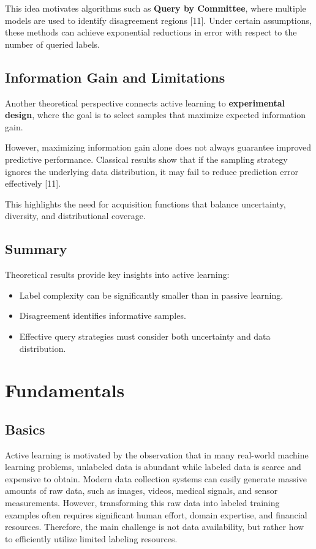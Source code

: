 \documentclass{article}
\renewcommand{\cite}[1]{[#1]}
\begin{document}
This idea motivates algorithms such as \textbf{Query by Committee}, where multiple models are used to identify disagreement regions \cite{11}. Under certain assumptions, these methods can achieve exponential reductions in error with respect to the number of queried labels.

\subsection{Information Gain and Limitations}

Another theoretical perspective connects active learning to \textbf{experimental design}, where the goal is to select samples that maximize expected information gain.

However, maximizing information gain alone does not always guarantee improved predictive performance. Classical results show that if the sampling strategy ignores the underlying data distribution, it may fail to reduce prediction error effectively \cite{11}.

This highlights the need for acquisition functions that balance uncertainty, diversity, and distributional coverage.

\subsection{Summary}

Theoretical results provide key insights into active learning:
\begin{itemize}
    \item Label complexity can be significantly smaller than in passive learning.
    \item Disagreement identifies informative samples.
    \item Effective query strategies must consider both uncertainty and data distribution.
\end{itemize}

\section{Fundamentals}

\subsection{Basics}

Active learning is motivated by the observation that in many real-world machine learning problems, unlabeled data is abundant while labeled data is scarce and expensive to obtain. Modern data collection systems can easily generate massive amounts of raw data, such as images, videos, medical signals, and sensor measurements. However, transforming this raw data into labeled training examples often requires significant human effort, domain expertise, and financial resources. Therefore, the main challenge is not data availability, but rather how to efficiently utilize limited labeling resources.
\end{document}
